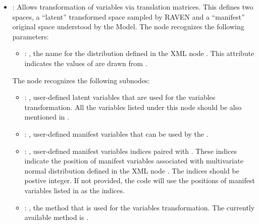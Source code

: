 \begin{itemize}
    \item {}:
      Allows transformation of variables via translation matrices. This defines two spaces,
      a ``latent'' transformed space sampled by RAVEN and a ``manifest'' original space understood
      by the Model.
      The  node recognizes the following parameters:
        \begin{itemize}
          \item {}: ,
            the name for the distribution defined in the XML node .
            This attribute indicates the values of  are drawn from
            .
      \end{itemize}

      The  node recognizes the following subnodes:
      \begin{itemize}
        \item {}: ,
          user-defined latent variables that are used for the variables transformation.
          All the variables listed under this node should be also mentioned in .

        \item {}: ,
          user-defined manifest variables that can be used by the .

        \item {}: ,
          user-defined manifest variables indices paired with .
          These indices indicate the position of manifest variables associated with multivariate
          normal               distribution defined in the XML node .
          The indices should be postive integer. If not provided, the code will use the positions
          of manifest variables listed in  as the indices.

        \item {}: ,
          the method that is used for the variables transformation. The currently available method
          is .
      \end{itemize}
  \end{itemize}

